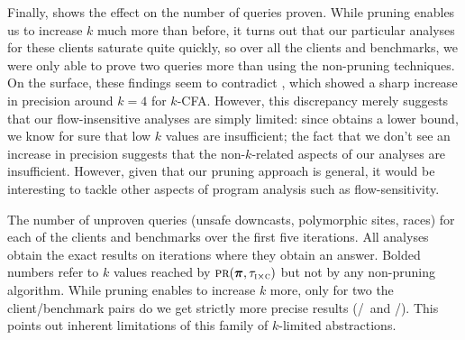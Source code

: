 Finally,  shows the effect on the number of queries proven.
While pruning enables us to increase $k$ much more than before, it turns out
that our particular analyses for these clients saturate quite quickly, so
over all the clients and benchmarks,
we were only able to prove two queries more than using the non-pruning techniques.
On the surface, these findings seem to contradict \cite{liang10abstraction},
which showed a sharp increase in precision around $k=4$ for $k$-CFA.  However,
this discrepancy merely suggests that our flow-insensitive analyses are simply
limited: since \cite{liang10abstraction} obtains a lower bound, we know for
sure that low $k$ values are insufficient; the fact that we don't see an
increase in precision suggests that the non-$k$-related aspects of our analyses
are insufficient.  However, given that our pruning approach is general, it
would be interesting to tackle other aspects of program analysis such as
flow-sensitivity.

\begin{table}
\small
\centering

\caption{\label{tab:numUnproven} The number of unproven queries (unsafe
downcasts, polymorphic sites, races) for each of the clients and benchmarks
over the first five iterations.
All analyses obtain the exact results on iterations where they obtain an answer.
Bolded numbers refer to $k$ values reached by $\text{\sc pr}(\mbox{\boldmath$\pi$},\tau_{\text{\sc i} \times \text{\sc c}})$
but not by any non-pruning algorithm.
While pruning enables to increase $k$ more,
only for two the client/benchmark pairs do we get strictly more precise results
(\downcast/\hedc\ and \downcast/\lusearch).
This points out inherent limitations of this family of $k$-limited abstractions.
}
\end{table}
